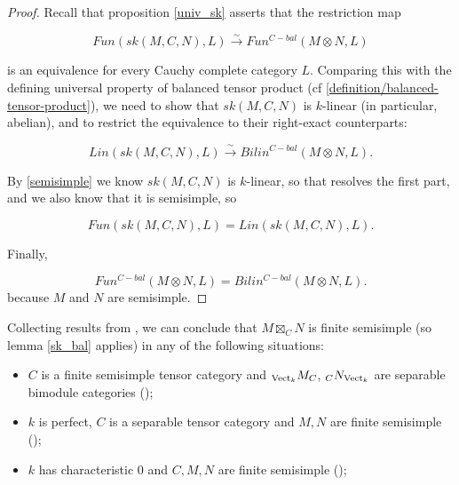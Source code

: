 \begin{proof}
  Recall that proposition \ref{univ_sk} asserts that the restriction map

  \[
   Fun(sk(M,C,N),L) \xrightarrow{\sim} Fun^{C-bal}(M \otimes N,L)
  \]

  is an equivalence for every Cauchy complete category $L$. Comparing this
  with the defining universal property of balanced tensor product
  (cf \ref{definition/balanced-tensor-product}), we need to show that
  $sk(M,C,N)$ is $k$-linear (in particular, abelian), and to restrict the
  equivalence to their right-exact counterparts:

  \[
    Lin(sk(M,C,N),L) \xrightarrow{\sim} Bilin^{C-bal}(M \otimes N, L).
  \]

  By \ref{semisimple} we know $sk(M,C,N)$ is $k$-linear, so that resolves the
  first part, and we also know that it is semisimple, so

  \[
    Fun(sk(M,C,N), L) = Lin(sk(M,C,N), L).
  \]

  Finally,

  \[
    Fun^{C-bal}(M \otimes N, L) = Bilin^{C-bal}(M \otimes N, L).
  \] because $M$ and $N$ are semisimple.
\end{proof}

\begin{remark}\label{semisimple_douglas/dualizable-tensor-categories}

  \noindent Collecting results
  from \cite{douglas/dualizable-tensor-categories}, we can conclude that
  $M\boxtimes_C N$ is finite semisimple (so lemma \ref{sk_bal} applies) in any
  of the following situations:

  \begin{itemize}

    \item $C$ is a finite semisimple tensor category and $_{\operatorname{Vect}_k}M_C$,
    $_{C}N_{\operatorname{Vect}_k}$ are separable bimodule categories (\cite[Proposition
    2.5.3, Theorem 2.5.5]{douglas/dualizable-tensor-categories});

    \item $k$ is perfect, $C$ is a separable tensor category and $M,N$ are
    finite semisimple (\cite[Proposition
    2.5.10]{douglas/dualizable-tensor-categories});

    \item $k$ has characteristic $0$ and $C,M,N$ are finite semisimple
    (\cite[Corollary 2.6.9]{douglas/dualizable-tensor-categories});

  \end{itemize}
\end{remark}

